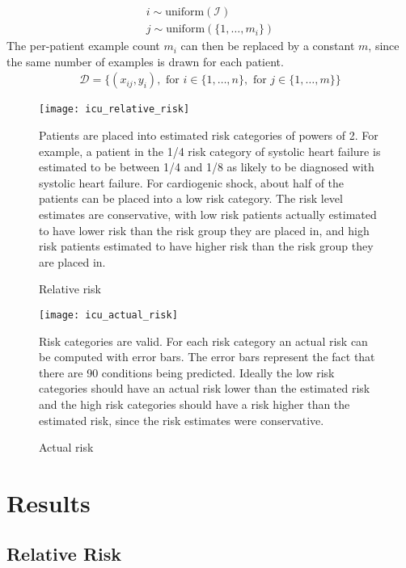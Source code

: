\begin{gather}
    i \sim \text{uniform}(\mathcal{I}) \\
    j \sim \text{uniform}(\{1, \dots, m_i\})
\end{gather}
The per-patient example count $m_i$ can then be replaced by a constant $m$, since the same number of examples is drawn for each patient.
\begin{gather}
    \mathcal{D} = \{
        (x_{ij}, y_i),
        \text{ for } i \in \{ 1, \dots, n \},
        \text{ for } j \in \{ 1, \dots, m \}
    \}
\end{gather}

\begin{figure}
\texttt{[image: icu\_relative\_risk]}
\caption{Relative risk}
\vspace{12px}
Patients are placed into estimated risk categories of powers of 2.  For example, a patient in the 1/4 risk category of systolic heart failure is estimated to be between 1/4 and 1/8 as likely to be diagnosed with systolic heart failure.  For cardiogenic shock, about half of the patients can be placed into a low risk category.  The risk level estimates are conservative, with low risk patients actually estimated to have lower risk than the risk group they are placed in, and high risk patients estimated to have higher risk than the risk group they are placed in.
\label{fig:icu_relative_risk}
\end{figure}

\begin{figure}
\texttt{[image: icu\_actual\_risk]}
\caption{Actual risk}
\vspace{12px}
Risk categories are valid.  For each risk category an actual risk can be computed with error bars.  The error bars represent the fact that there are 90 conditions being predicted.  Ideally the low risk categories should have an actual risk lower than the estimated risk and the high risk categories should have a risk higher than the estimated risk, since the risk estimates were conservative.
\label{fig:icu_actual_risk}
\end{figure}

\pagebreak
\section{Results}

\subsection{Relative Risk}

